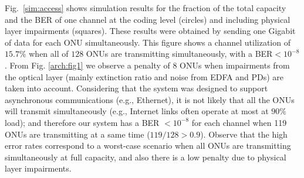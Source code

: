 \documentclass[a4paper,10pt]{report}
\begin{document}
Fig.~\ref{sim:access} shows simulation results for the fraction of the total
capacity and the BER of one channel at the coding level (circles) and 
including physical layer impairments (squares). These results were obtained by
sending one Gigabit of data for each ONU simultaneously.
This figure shows a channel utilization of $15.7\%$ when all of $128$ ONUs
are transmitting simultaneously, with a BER$<10^{-8}$. 
From Fig. \ref{arch:fig1} we observe a penalty of $8$ ONUs when
impairments from the optical layer (mainly extinction ratio and noise from EDFA and PDs) are taken into account.
Considering that the system was designed to support asynchronous communications (e.g., Ethernet), it is not likely that all the ONUs will transmit simultaneously (e.g., Internet links often operate at most at $90\%$ load); and therefore our system has a BER $<10^{-8}$ for each channel when 119 ONUs are transmitting at a same time ($119/128>0.9$).
%
Observe that the high error rates correspond to a
worst-case scenario when all ONUs are transmitting simultaneously at
full capacity, and also 
there is a low penalty due to physical layer impairments.
\end{document}
